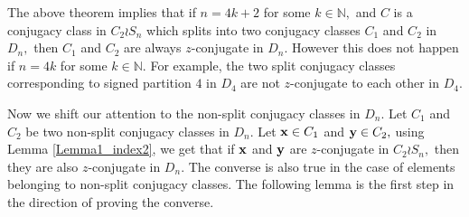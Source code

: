 \documentclass[12pt,twoside,reqno]{amsart}
\theoremstyle{definition}
\numberwithin{equation}{section}
\begin{document}
The above theorem implies that if $n=4k+2$ for some $k\in \mathbb N,$ and $C$ is a conjugacy class in $C_2 \wr S_n$ which  splits into two conjugacy classes $C_1$ and $C_2$ in $D_n,$ then $C_1$ and $C_2$ are always $z$-conjugate in $D_n.$ However this does not happen if $n=4k$ for some $k\in \mathbb N.$ For example, the two split conjugacy classes corresponding to signed partition $4$ in $D_4$ are not $z$-conjugate to each other in $D_4.$


Now we shift our attention to the non-split conjugacy classes in $D_n.$ Let $C_1$ and $C_2$ be two non-split conjugacy classes in $D_n.$ Let ${\bf x}\in C_1$ and ${\bf y}\in C_2, $ using Lemma \ref{Lemma1_index2}, we get that if ${\bf x}$ and ${\bf y}$ are $z$-conjugate in $C_2\wr S_n,$ then they are also $z$-conjugate in $D_n.$ The converse is also true in the case of elements belonging to non-split conjugacy classes. The following lemma is the first step in the direction of proving the converse.
\end{document}

